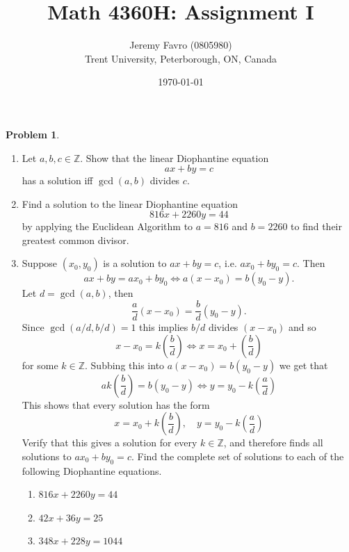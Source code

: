 \documentclass[10pt]{article}
\title{Math 4360H: Assignment I}
\author{Jeremy Favro (0805980) \\ Trent University, Peterborough, ON, Canada}
\date{\today}
\theoremstyle{definition}
\newtheorem{problem}{Problem}
\begin{document}
\maketitle

\begin{problem}
\begin{enumerate}[label=(\alph*)]
  \item Let $a,b,c\in \mathbb{Z}$. Show that the linear Diophantine equation
        $$ax+by=c$$
        has a solution iff $\gcd(a,b)$ divides $c$.
  \item Find a solution to the linear Diophantine equation
        $$816x+2260y=44$$
        by applying the Euclidean Algorithm to $a=816$ and $b=2260$ to find their greatest common divisor.
  \item Suppose $(x_0,y_0)$ is a solution to $ax+by=c$, i.e. $ax_0+by_0=c$. Then
        $$ax+by=ax_0+by_0\iff a(x-x_0)=b(y_0-y).$$
        Let $d=\gcd(a,b)$, then
        $$\frac{a}{d}(x-x_0)=\frac{b}{d}(y_0-y).$$
        Since $\gcd(a/d,b/d)=1$ this implies $b/d$ divides $(x-x_0)$ and so
        $$x-x_0=k\left(\frac{b}{d}\right)\iff x=x_0+\left(\frac{b}{d}\right)$$
        for some $k\in \mathbb{Z}$. Subbing this into $a(x-x_0)=b(y_0-y)$ we get
        that $$ak\left(\frac{b}{d}\right)=b(y_0-y)\iff y=y_0-k\left(\frac{a}{d}\right)$$
        This shows that every solution has the form
        $$x=x_0+k\left(\frac{b}{d}\right),\quad y=y_0-k\left(\frac{a}{d}\right)$$
        Verify that this gives a solution for every $k\in\mathbb{Z}$, and therefore
        finds all solutions to $ax_0 + by_0 = c$.
        Find the complete set of solutions to each of the following Diophantine equations.
        \begin{enumerate}[label=(\roman*)]
          \item $816x+2260y=44$
          \item $42x+36y=25$
          \item $348x+228y=1044$
        \end{enumerate}
\end{enumerate}
\end{problem}
\end{document}
